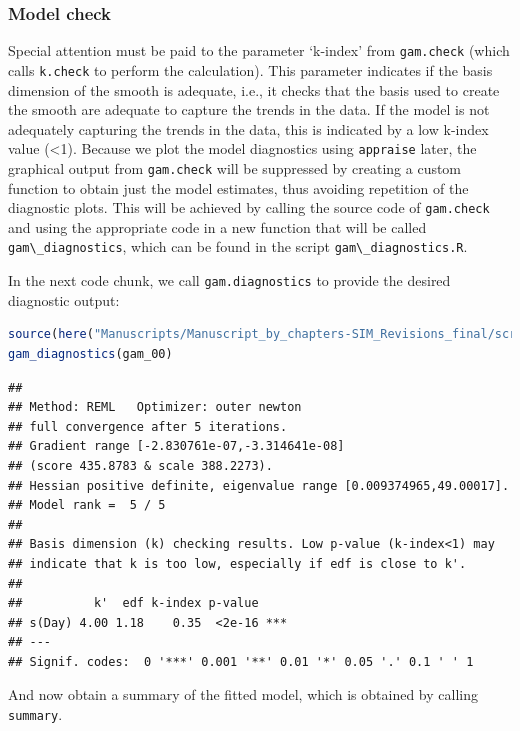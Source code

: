 \documentclass[
]{article}
\newcommand{\passthrough}[1]{#1}
\begin{document}
\hypertarget{gam-00-model-check}{%
\subsubsection{Model check}\label{gam-00-model-check}}

Special attention must be paid to the parameter `k-index' from \passthrough{\lstinline!gam.check!} (which calls \passthrough{\lstinline!k.check!} to perform the calculation). This parameter indicates if the basis dimension of the smooth is adequate, i.e., it checks that the basis used to create the smooth are adequate to capture the trends in the data. If the model is not adequately capturing the trends in the data, this is indicated by a low k-index value (\textless1). Because we plot the model diagnostics using \passthrough{\lstinline!appraise!} later, the graphical output from \passthrough{\lstinline!gam.check!} will be suppressed by creating a custom function to obtain just the model estimates, thus avoiding repetition of the diagnostic plots. This will be achieved by calling the source code of \passthrough{\lstinline!gam.check!} and using the appropriate code in a new function that will be called \passthrough{\lstinline!gam\_diagnostics!}, which can be found in the script \passthrough{\lstinline!gam\_diagnostics.R!}.

In the next code chunk, we call \passthrough{\lstinline!gam.diagnostics!} to provide the desired diagnostic output:

\begin{lstlisting}[language=R]
source(here("Manuscripts/Manuscript_by_chapters-SIM_Revisions_final/scripts","gam_diagnostics.R"))
gam_diagnostics(gam_00)
\end{lstlisting}

\begin{lstlisting}
## 
## Method: REML   Optimizer: outer newton
## full convergence after 5 iterations.
## Gradient range [-2.830761e-07,-3.314641e-08]
## (score 435.8783 & scale 388.2273).
## Hessian positive definite, eigenvalue range [0.009374965,49.00017].
## Model rank =  5 / 5 
## 
## Basis dimension (k) checking results. Low p-value (k-index<1) may
## indicate that k is too low, especially if edf is close to k'.
## 
##          k'  edf k-index p-value    
## s(Day) 4.00 1.18    0.35  <2e-16 ***
## ---
## Signif. codes:  0 '***' 0.001 '**' 0.01 '*' 0.05 '.' 0.1 ' ' 1
\end{lstlisting}

And now obtain a summary of the fitted model, which is obtained by calling \passthrough{\lstinline!summary!}.
\end{document}
